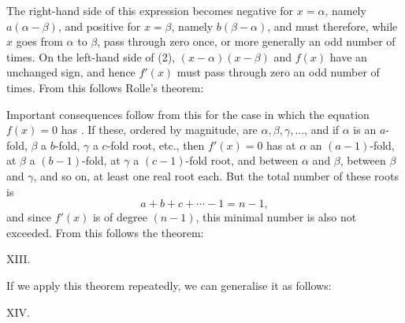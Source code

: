 The right-hand side of this expression becomes negative for $x = \alpha$, namely
$a(\alpha - \beta)$, and positive for $x = \beta$, namely $b(\beta - \alpha)$,
and must therefore, while $x$ goes from $\alpha$ to $\beta$, pass through zero
once, or more generally an odd number of times. On the left-hand
side of (2), $(x-\alpha)(x-\beta)$ and $f(x)$ have an unchanged
sign, and hence $f'(x)$ must pass through zero an odd number of
times. From this follows Rolle's theorem:


Important consequences follow from this for the case in which the equation
$f(x) = 0$ has . If these, ordered by magnitude, are
$\alpha, \beta, \gamma, \dots$, and if $\alpha$ is an $a$-fold, $\beta$ a
$b$-fold, $\gamma$ a $c$-fold root, etc., then $f'(x) = 0$ has at
$\alpha$ an $(a-1)$-fold, at $\beta$ a $(b-1)$-fold, at $\gamma$ a
$(c-1)$-fold root, and between $\alpha$ and $\beta$, between $\beta$ and
$\gamma$, and so on, at least one real root each. But the total number of these
roots is
\[
a + b + c + \cdots - 1 = n - 1,
\]
and since $f'(x)$ is of degree $(n-1)$, this minimal
number is also not exceeded. From this follows the theorem:

XIII. 

If we apply this theorem repeatedly, we can generalise it as
follows:

XIV. 
